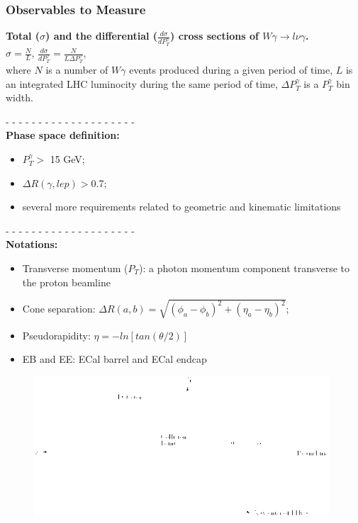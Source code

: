 \begin{frame}\frametitle{Observables to Measure}
  \scriptsize
  {\bfseries{Total ($\sigma$) and the differential ($\frac{d\sigma}{dP_T^{\gamma}}$) cross sections of $W\gamma\rightarrow l\nu\gamma$.}}\\
  $\sigma = \frac{N}{L}$, $\frac{d\sigma}{dP_T^{\gamma}} = \frac{N}{L \Delta P_T^{\gamma}}$, \\
  \tiny
  where $N$ is a number of $W\gamma$ events produced during a given period of time, $L$ is an integrated LHC luminocity during the same period of time, $\Delta P_T^{\gamma}$ is a $P_T^{\gamma}$ bin width.\\


\begin{minipage}[c]{0.49\textwidth}
  \tiny
  - - - - - - - - - - - - - - - - - - - - \\
  {\bfseries{Phase space definition:}}
  \begin{itemize}
    \tiny
    \item $P_T^{\gamma}>$ 15 GeV;
    \item $\Delta{R}(\gamma,lep) > $0.7;
    \item several more requirements related to geometric and kinematic limitations
  \end{itemize}
  - - - - - - - - - - - - - - - - - - - - \\
  \tiny
  {\bfseries{Notations:}}
  \begin{itemize}
    \tiny
    \item Transverse momentum ($P_T$):  a photon momentum component transverse to the proton beamline
    \item Cone separation: $\Delta R(a,b) = \sqrt{ (\phi_a-\phi_b)^2 + (\eta_a-\eta_b)^2 }$;
    \item Pseudorapidity: $\eta=-ln \left[ tan{(\theta/2)} \right]$
    \item EB and EE: ECal barrel and ECal endcap
  \end{itemize}
\end{minipage}%
\begin{minipage}[c]{0.49\textwidth}
  \begin{figure}[htb]
    \begin{center}
      \includegraphics[width=0.98\textwidth]{../figs/ForPresentation/CMS_coordinateSystem.png}\\

\end{center}
\end{figure}
\end{minipage}
\end{frame}

